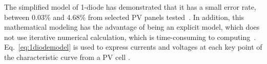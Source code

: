 \documentclass[journal]{IEEEtran}
\begin{document}
The simplified model of 1-diode has demonstrated that it has a small error rate, between 0.03\% and 4.68\% from selected PV panels tested~\cite{Saloux}. In addition, this mathematical modeling has the advantage of being an explicit model, which does not use iterative numerical calculation, which is time-consuming to computing~\cite{Cubas}. 
%
Eq.~\eqref{eq:1diodemodel} is used to express currents and voltages at each key point of the characteristic curve from a PV cell \cite{Villalva}.
%
%
%
%
%
%
%
\end{document}
